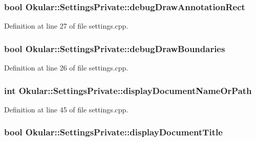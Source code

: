 \hypertarget{classOkular_1_1SettingsPrivate_a040f796657dfe0905ed71b629e9b9009}{
\subsubsection[{debug\+Draw\+Annotation\+Rect}]{\setlength{\rightskip}{0pt plus 5cm}bool Okular\+::\+Settings\+Private\+::debug\+Draw\+Annotation\+Rect}}\label{classOkular_1_1SettingsPrivate_a040f796657dfe0905ed71b629e9b9009}


Definition at line 27 of file settings.\+cpp.

\hypertarget{classOkular_1_1SettingsPrivate_a9966867211ca301a2d11f3016a9db3ca}{
\subsubsection[{debug\+Draw\+Boundaries}]{\setlength{\rightskip}{0pt plus 5cm}bool Okular\+::\+Settings\+Private\+::debug\+Draw\+Boundaries}}\label{classOkular_1_1SettingsPrivate_a9966867211ca301a2d11f3016a9db3ca}


Definition at line 26 of file settings.\+cpp.

\hypertarget{classOkular_1_1SettingsPrivate_a3f6c60aec6fe2cc4acf6d21382d57abf}{
\subsubsection[{display\+Document\+Name\+Or\+Path}]{\setlength{\rightskip}{0pt plus 5cm}int Okular\+::\+Settings\+Private\+::display\+Document\+Name\+Or\+Path}}\label{classOkular_1_1SettingsPrivate_a3f6c60aec6fe2cc4acf6d21382d57abf}


Definition at line 45 of file settings.\+cpp.

\hypertarget{classOkular_1_1SettingsPrivate_a6a8c4abf8094c77e469831b6e0d4b2ea}{
\subsubsection[{display\+Document\+Title}]{\setlength{\rightskip}{0pt plus 5cm}bool Okular\+::\+Settings\+Private\+::display\+Document\+Title}}\label{classOkular_1_1SettingsPrivate_a6a8c4abf8094c77e469831b6e0d4b2ea}



